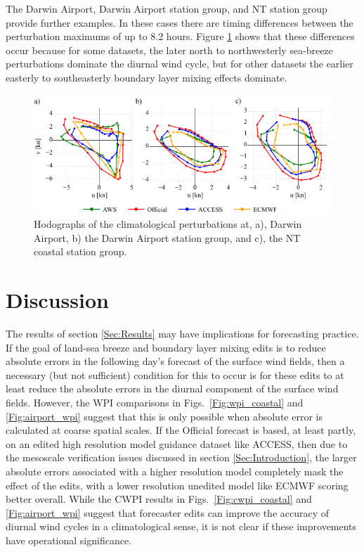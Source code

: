 \documentclass{ametsoc}
\begin{document}
The Darwin Airport, Darwin Airport station group, and NT station group provide further examples. In these cases there are timing differences between the perturbation maximums of up to 8.2 hours. Figure \ref{Fig:nt_ellipse_hodo} shows that these differences occur because for some datasets, the later north to northwesterly sea-breeze perturbations dominate the diurnal wind cycle, but for other datasets the earlier easterly to southeasterly boundary layer mixing effects dominate. 

\begin{figure}
\centering
\includegraphics[width=39pc]{nt_ellipse_hodo.pdf}
\caption{Hodographs of the climatological perturbations at, a), Darwin Airport, b) the Darwin Airport station group, and c), the NT coastal station group.}
\label{Fig:nt_ellipse_hodo}
\end{figure}

\section{Discussion}
\label{Sec:Discussion}
The results of section \ref{Sec:Results} may have implications for forecasting practice. If the goal of land-sea breeze and boundary layer mixing edits is to reduce absolute errors in the following day's forecast of the surface wind fields, then a necessary (but not sufficient) condition for this to occur is for these edits to at least reduce the absolute errors in the diurnal component of the surface wind fields. However, the WPI comparisons in Figs.~\ref{Fig:wpi_coastal} and \ref{Fig:airport_wpi} suggest that this is only possible when absolute error is calculated at coarse spatial scales. If the Official forecast is based, at least partly, on an edited high resolution model guidance dataset like ACCESS, then due to the mesoscale verification issues discussed in section \ref{Sec:Introduction}, the larger absolute errors associated with a higher resolution model completely mask the effect of the edits, with a lower resolution unedited model like ECMWF scoring better overall. While the CWPI results in Figs.~\ref{Fig:cwpi_coastal} and \ref{Fig:airport_wpi} suggest that forecaster edits can improve the accuracy of diurnal wind cycles in a climatological sense, it is not clear if these improvements have operational significance. 
\end{document}
